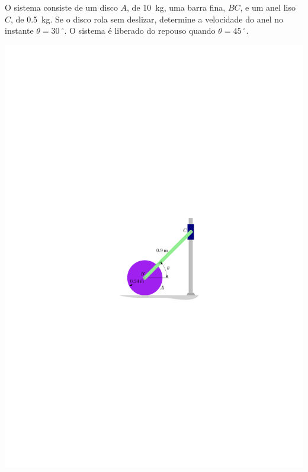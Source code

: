 \item O sistema consiste de um disco $A$, de \SI{10}{\kilogram}, uma barra fina, $BC$, e um anel liso $C$, de \SI{.5}{\kilogram}. Se o disco rola sem deslizar, determine a velocidade do anel no instante $\theta=\SI{30}{^{\circ}}$. O sistema é liberado do repouso quando $\theta=\SI{45}{^{\circ}}$.


\begin{flushright}
	\includegraphics[scale=1.2]{../../images/draw_6}
\end{flushright}